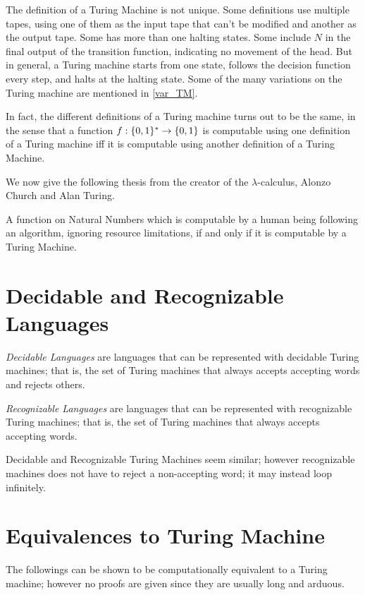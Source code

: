 \documentclass{report}
\begin{document}
		The definition of a Turing Machine is not unique. Some definitions use multiple tapes, using one of them as the input tape that can't be modified and another as the output tape. Some has more than one halting states. Some include $N$ in the final output of the transition function, indicating no movement of the head. But in general, a Turing machine starts from one state, follows the decision function every step, and halts at the halting state. Some of the many variations on the Turing machine are mentioned in \ref{var_TM}.
		
		In fact, the different definitions of a Turing machine turns out to be the same, in the sense that a function $f:\{0,1\}^\ast \rightarrow \{0,1\}$ is computable using one definition of a Turing machine iff it is computable using another definition of a Turing Machine.
		
		We now give the following thesis from the creator of the $\lambda$-calculus, Alonzo Church and Alan Turing.
		\begin{thesis} \label{thm_church_turing}
			A function on Natural Numbers which is computable by a human being following an algorithm, ignoring resource limitations, if and only if it is computable by a Turing Machine.
		\end{thesis}
		
		\section{Decidable and Recognizable Languages}
		\begin{defn} \label{def_decidable_language}
			\emph{Decidable Languages} are languages that can be represented with decidable Turing machines; that is, the set of Turing machines that always accepts accepting words and rejects others.
		\end{defn}
	
		\begin{defn} \label{def_recognizable_language}
			\emph{Recognizable Languages} are languages that can be represented with recognizable Turing machines; that is, the set of Turing machines that always accepts accepting words.
		\end{defn}
		
		Decidable and Recognizable Turing Machines seem similar; however recognizable machines does not have to reject a non-accepting word; it may instead loop infinitely.
		
		\section{Equivalences to Turing Machine}
			The followings can be shown to be computationally equivalent to a Turing machine; however no proofs are given since they are usually long and arduous.
\end{document}
